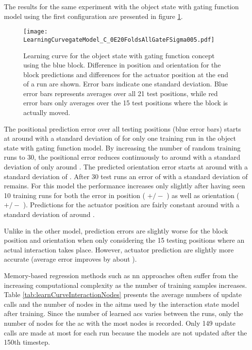 The results for the same experiment with the object state with gating function model using the first configuration are presented in figure \ref{fig:learnCurveGate1}.

\begin{figure}[h]
\centering
\texttt{[image: LearningCurvegateModel\_C\_0E20FoldsAllGateFSigma005.pdf]}
\caption{Learning curve for the object state with gating function concept using the blue block. Difference in position and orientation for the block predictions and differences for the actuator position at the end of a run are shown. Error bars indicate one standard deviation. Blue error bars represents averages over all 21 test positions, while red error bars only averages over the 15 test positions where the block is actually moved.}
\label{fig:learnCurveGate1}
\end{figure}

The positional prediction error over all testing positions (blue error bars) starts at around  with a standard deviation of  for only one training run in the object state with gating function model. By increasing the number of random training runs to 30, the positional error reduces continuously to around  with a standard deviation of only around .
The predicted orientation error starts at around  with a standard deviation of .
After 30 test runs an error of  with a standard deviation of  remains.
For this model the performance increases only slightly after having seen 10 training runs for both the error in position ( $+/-$ ) as well as orientation ( $+/-$ ).
Predictions for the actuator position are fairly constant around  with a standard deviation of around .

Unlike in the other model, prediction errors are slightly worse for the block position and orientation when only considering the 15 testing positions where an actual interaction takes place. However, actuator prediction are slightly more accurate (average error improves by about ).

Memory-based regression methods such as \gls{nn} approaches often suffer from the increasing computational complexity as the number of training samples increases.
Table \ref{tab:learnCurveInteractionNodes} presents the average numbers of update calls and the number of nodes in the \glspl{aitm} used by the interaction state model after training. Since the number of learned \glspl{ac} varies between the runs, only the number of nodes for the \gls{ac} with the most nodes is recorded. Only 149 update calls are made at most for each run because the models are not updated after the 150th timestep.

